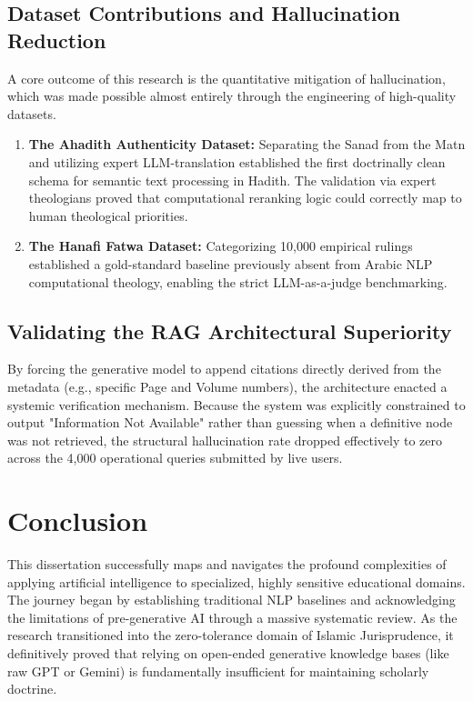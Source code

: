 \documentclass[12pt, a4paper]{report}
\begin{document}
\section{Dataset Contributions and Hallucination Reduction}
A core outcome of this research is the quantitative mitigation of hallucination, which was made possible almost entirely through the engineering of high-quality datasets.
\begin{enumerate}
    \item \textbf{The Ahadith Authenticity Dataset:} Separating the Sanad from the Matn and utilizing expert LLM-translation established the first doctrinally clean schema for semantic text processing in Hadith. The validation via expert theologians proved that computational reranking logic could correctly map to human theological priorities.
    \item \textbf{The Hanafi Fatwa Dataset:} Categorizing 10,000 empirical rulings established a gold-standard baseline previously absent from Arabic NLP computational theology, enabling the strict LLM-as-a-judge benchmarking.
\end{enumerate}

\section{Validating the RAG Architectural Superiority} 
By forcing the generative model to append citations directly derived from the metadata (e.g., specific Page and Volume numbers), the architecture enacted a systemic verification mechanism. Because the system was explicitly constrained to output "Information Not Available" rather than guessing when a definitive node was not retrieved, the structural hallucination rate dropped effectively to zero across the 4,000 operational queries submitted by live users. 

\chapter{Conclusion}
This dissertation successfully maps and navigates the profound complexities of applying artificial intelligence to specialized, highly sensitive educational domains. The journey began by establishing traditional NLP baselines and acknowledging the limitations of pre-generative AI through a massive systematic review. As the research transitioned into the zero-tolerance domain of Islamic Jurisprudence, it definitively proved that relying on open-ended generative knowledge bases (like raw GPT or Gemini) is fundamentally insufficient for maintaining scholarly doctrine. 
\end{document}
